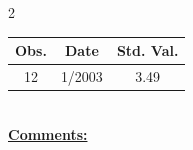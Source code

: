 
\bigskip 
\begin{multicols}{2}{ 
\begin{tabular}{ccc}
\hline  Obs.  &  Date &  Std. Val. \\ 
\hline 
                       12 &        1/2003 &          3.49 \vspace{-.12in} \\  
 \end{tabular} 
\\ 
 \columnbreak 
 \singlespacing 
 \underline{\textbf{Comments:}} \\ 
 \bigskip       

 } 
\end{multicols} 
